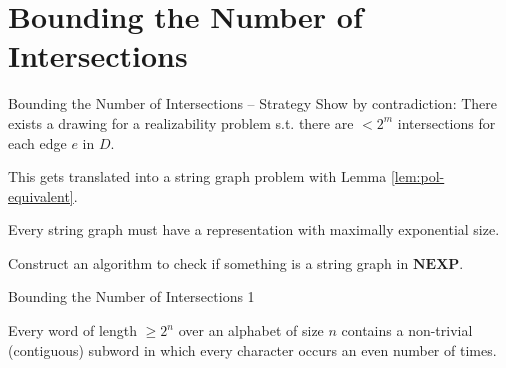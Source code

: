 \documentclass[10pt,aspectratio=169]{beamer}
\theoremstyle{plain}
\begin{document}
\section{Bounding the Number of Intersections \cite{schaefer01}}

\begin{frame}{Bounding the Number of Intersections -- Strategy}
    Show by contradiction: There exists a drawing for a realizability problem 
    s.t. there are \(< 2^m\) intersections for each edge \(e\) in \(D\).\pause

    This gets translated into a string graph problem with Lemma \ref{lem:pol-equivalent}.\pause

    Every string graph must have a representation with maximally exponential size.\pause

    Construct an algorithm to check if something is a string graph in \(\mathbf{NEXP}\).
\end{frame}

\begin{frame}{Bounding the Number of Intersections 1}
    \begin{lemma}
        Every word of length \(\geq 2^n\) over an alphabet of size \(n\) contains a non-trivial (contiguous) subword in which every character occurs an even number of times.
        \label{lem:even-occurrences}
    \end{lemma}
\end{frame}
\end{document}
